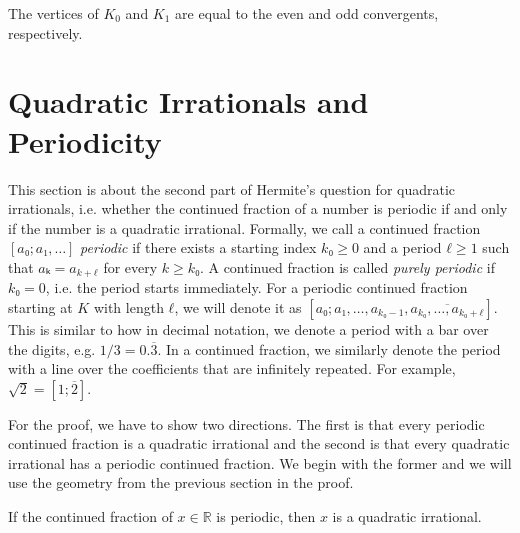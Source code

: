 \begin{corollary}
  The vertices of $K_0$ and $K_1$ are equal to the
  even and odd convergents, respectively.
\end{corollary}

\section{Quadratic Irrationals and Periodicity}
\label{sec:cf-quadratic}

This section is about the second part of Hermite's question for quadratic
irrationals, i.e. whether the continued fraction of a number is periodic if and only
if the number is a quadratic irrational.
Formally, we call a continued fraction $[a₀; a₁, …]$ \emph{periodic}
if there exists a starting index $k₀ ≥ 0$ and a period $ℓ ≥ 1$ such that $aₖ = a_{k+ℓ}$ for every $k ≥ k₀$.
A continued fraction is called \emph{purely periodic} if $k₀ = 0$,
i.e. the period starts immediately.
For a periodic continued fraction starting at $K$ with length $ℓ$,
we will denote it as $[a₀; a₁, …, a_{k₀-1}, \overline{a_{k₀}, …, a_{k₀+ℓ}}]$.
This is similar to how in decimal notation, we denote a period with a bar over the digits,
e.g. $1/3 = 0.\overline{3}$.
In a continued fraction, we similarly denote the period with a line over the
coefficients that are infinitely repeated.
For example, $\sqrt{2} = [1; \overline{2}]$.

For the proof, we have to show two directions.
The first is that every periodic continued fraction is a quadratic irrational
and the second is that every quadratic irrational has a periodic continued fraction.
We begin with the former and we will use the geometry from the previous section
in the proof.

\begin{theorem}
  If the continued fraction of $x ∈ ℝ$ is periodic, then $x$ is a quadratic irrational.
\end{theorem}

